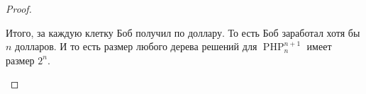 \begin{proof}
\begin{enumerate}
        Итого, за каждую клетку Боб получил по доллару. То есть Боб заработал хотя бы $n$ долларов. И то есть размер любого дерева решений для $\operatorname{PHP}^{n+1}_n$ имеет размер $2^n$.
    \end{enumerate}
\end{proof}